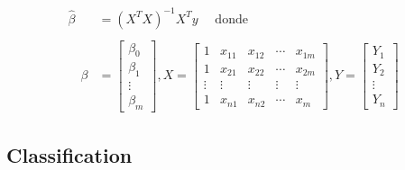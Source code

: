 \begin{itemize}
        \begin{align*}
          \hat{\beta} & =\left(X^{T} X\right)^{-1} X^{T} y \quad \text { donde }                          \\
          \\
          \quad \beta & =\left[\begin{array}{c}
                                   \beta_{0} \\
                                   \beta_{1} \\
                                   \vdots    \\
                                   \beta_{m}
                                 \end{array}\right], X=\left[\begin{array}{ccccc}
                                                               1      & x_{11}  & x_{12}  & \cdots & x_{1 m} \\
                                                               1      & x_{21}  & x_{22}  & \cdots & x_{2 m} \\
                                                               \vdots & \vdots  & \vdots  & \vdots & \vdots  \\
                                                               1      & x_{n 1} & x_{n 2} & \cdots & x_{m}
                                                             \end{array}\right], Y=\left[\begin{array}{c}
                                                                                           Y_{1}  \\
                                                                                           Y_{2}  \\
                                                                                           \vdots \\
                                                                                           Y_{n}
                                                                                         \end{array}\right]
        \end{align*}

\end{itemize}

\subsection{Classification}

